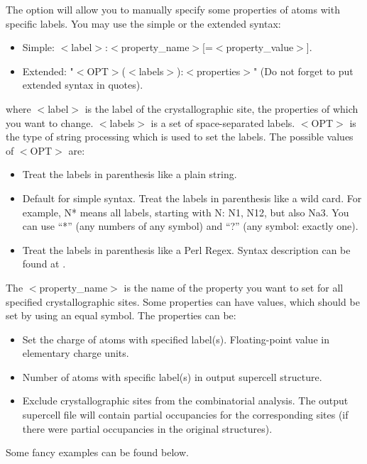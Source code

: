 \documentclass[a4paper,english]{article}
\begin{document}
\begin{Description}
\item[\oOptArg{-p }{labels-properties}, \oOptArg{\Dd property=}{labels-properties}]
      The option will allow you to manually specify some properties of atoms with specific labels. You may use the simple or the extended syntax:
       \begin{itemize}
         \item Simple: $<$label$>$:$<$property\_name$>$[=$<$property\_value$>$].
         \item Extended: "$<$OPT$>$($<$labels$>$):{$<$properties$>$}" (Do not forget to put extended syntax in quotes).
       \end{itemize}
       where $<$label$>$ is the label of the crystallographic site, the properties of which you want to change. $<$labels$>$ is a set of space-separated labels. $<$OPT$>$ is the type of string processing which is used to set the labels. The possible values of $<$OPT$>$ are:
       \begin{itemize}
         \item[p] Treat the labels in parenthesis like a plain string. 
         \item[w, ""] Default for simple syntax. Treat the labels in parenthesis like a wild card. For example, N* means all labels, starting with N: N1, N12, but also Na3. You can use ``*'' (any numbers of any symbol) and ``?'' (any symbol: exactly one).
         \item[r] Treat the labels in parenthesis like a Perl Regex. Syntax description can be found at .
       \end{itemize}
       The $<$property\_name$>$ is the name of the property you want to set for all specified crystallographic sites. Some properties can have values, which should be set by using an equal symbol. The properties can be:
       \begin{itemize}
         \item[c\Lbr harge\Rbr] Set the charge of atoms with specified label(s). Floating-point value in elementary charge units.
         \item[p\Lbr opulation\Rbr] Number of atoms with specific label(s) in output supercell structure.
         \item[\Lbr not\Rbr fixed] Exclude crystallographic sites from the combinatorial analysis. The output supercell file will contain partial occupancies for the corresponding sites (if there were partial occupancies in the original structures).
       \end{itemize}
       Some fancy examples can be found below.      
      

\end{Description}
\end{document}
